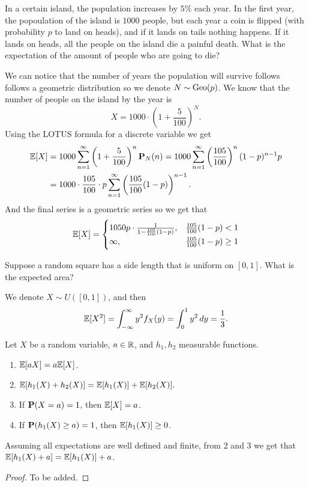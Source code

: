 \documentclass[11pt,a4paper]{article}
\begin{document}
  \begin{example}
    In a certain island, the population increases by $5\%$ each year.
    In the first year, the popoulation of the island is $1000$ people,
    but each year a coin is flipped (with probability $p$ to land on heads),
    and if it lands on tails nothing happens. If it lands on heads, all
    the people on the island die a painful death. What is the expectation
    of the amount of people who are going to die?

    We can notice that the number of years the population will survive
    follows follows a geometric distribution so we denote $N \sim \operatorname{Geo}(p)$.
    We know that the number of people on the island by the year is
    \[
      X = 1000 \cdot \left(1 + \frac{5}{100}\right)^N.
    \]
    Using the LOTUS formula for a discrete variable we get
    \begin{align*}
      \mathbb{E}[X] &= 
      1000 \sum_{n=1}^{\infty} \left(1 + \frac{5}{100}\right)^n 
      \mathbf{P}_N(n) =
      1000 \sum_{n=1}^{\infty} \left(\frac{105}{100}\right)^n 
      (1 - p)^{n - 1} p \\ &=
      1000 \cdot \frac{105}{100} \cdot p 
      \sum_{n=1}^{\infty} \left(\frac{105}{100}(1-p)\right)^{n-1}.
    \end{align*}
    And the final series is a geometric series so we get that
    \[
      \mathbb{E}[X] =
      \begin{cases}
        1050 p \cdot \frac{1}{1 - \frac{105}{100}(1 - p)},
        &\frac{105}{100}(1-p) < 1 \\
        \infty,
        &\frac{105}{100}(1-p) \geq 1
      \end{cases}
    \]
  \end{example}

  \begin{example}
    Suppose a random square has a side length that is uniform on $[0,1]$.
    What is the expected area?

    We denote $X \sim U([0,1])$, and then
    \[
      \mathbb{E}[X^{2}] =
      \int_{-\infty}^{\infty} y^{2} f_{X}(y) =
      \int_{0}^{1}y^{2}\,dy =
      \frac{1}{3}.
    \]
  \end{example}

  \begin{proposition}
    Let $X$ be a random variable, $a \in \mathbb{R}$, and $h_1,h_2$ measurable
    functions.
    \begin{enumerate}
      \item $\mathbb{E}[aX] = a \mathbb{E}[X]$.
      \item $\mathbb{E}[h_1(X) + h_2(X)] = 
          \mathbb{E}[h_1(X)] + \mathbb{E}[h_2(X)].$
      \item If $\mathbf{P}(X=a) = 1$, then $\mathbb{E}[X] = a$.
      \item If $\mathbf{P}(h_1(X) \geq a) = 1$, then 
          $\mathbb{E}[h_1(X)] \geq 0$.
    \end{enumerate}
    Assuming all expectations are well defined and finite, from $2$ and $3$
    we get that $\mathbb{E}[h_{1}(X)+a]=\mathbb{E}[h_{1}(X)] + a$.
  \end{proposition}
  \begin{proof}
    To be added.
  \end{proof}
\end{document}

